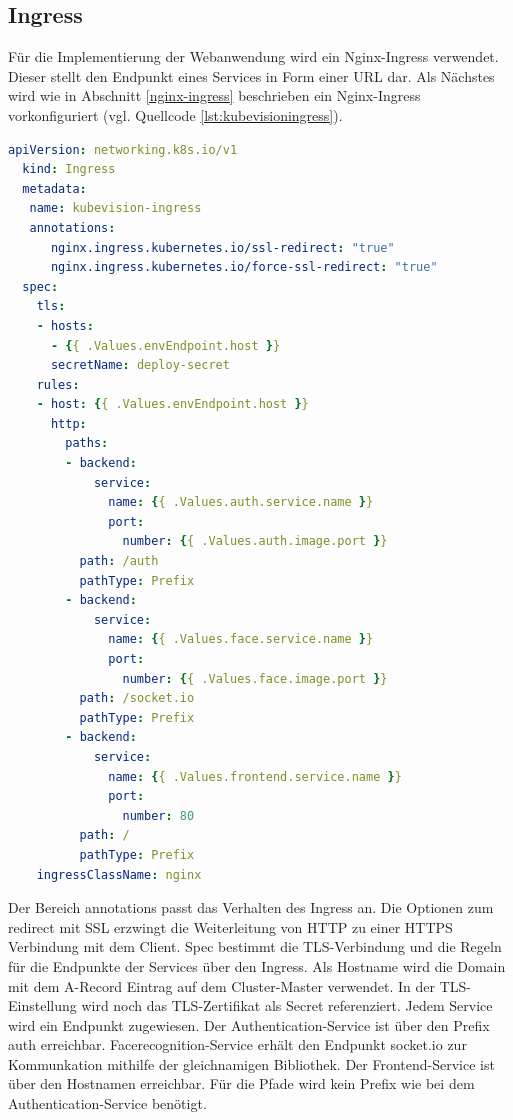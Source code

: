 \subsection{Ingress}

Für die Implementierung der Webanwendung wird ein Nginx-Ingress verwendet.
Dieser stellt den Endpunkt eines Services in Form einer URL dar.
Als Nächstes wird wie in Abschnitt \ref{nginx-ingress} beschrieben ein Nginx-Ingress vorkonfiguriert (vgl. Quellcode \ref{lst:kubevisioningress}).


\begin{lstlisting}[caption={kubevision-ingress.yaml},captionpos=b,label={lst:kubevisioningress},language=yaml]
  apiVersion: networking.k8s.io/v1
  kind: Ingress
  metadata:
   name: kubevision-ingress
   annotations:
      nginx.ingress.kubernetes.io/ssl-redirect: "true"
      nginx.ingress.kubernetes.io/force-ssl-redirect: "true"
  spec:
    tls:
    - hosts:
      - {{ .Values.envEndpoint.host }}
      secretName: deploy-secret
    rules:
    - host: {{ .Values.envEndpoint.host }}
      http:
        paths:
        - backend:
            service:
              name: {{ .Values.auth.service.name }}
              port:
                number: {{ .Values.auth.image.port }}
          path: /auth
          pathType: Prefix
        - backend:
            service:
              name: {{ .Values.face.service.name }}
              port:
                number: {{ .Values.face.image.port }}
          path: /socket.io
          pathType: Prefix
        - backend:
            service:
              name: {{ .Values.frontend.service.name }}
              port:
                number: 80
          path: /
          pathType: Prefix
    ingressClassName: nginx

\end{lstlisting}

Der Bereich annotations passt das Verhalten des Ingress an.
Die Optionen zum redirect mit SSL erzwingt die Weiterleitung von HTTP zu einer HTTPS Verbindung mit dem Client.
Spec bestimmt die TLS-Verbindung und die Regeln für die Endpunkte der Services über den Ingress.
Als Hostname wird die Domain mit dem A-Record Eintrag auf dem Cluster-Master verwendet.
In der TLS-Einstellung wird noch das TLS-Zertifikat als Secret referenziert.
Jedem Service wird ein Endpunkt zugewiesen.
Der Authentication-Service ist über den Prefix auth erreichbar.
Facerecognition-Service erhält den Endpunkt socket.io zur Kommunkation mithilfe der gleichnamigen Bibliothek.
Der Frontend-Service ist über den Hostnamen erreichbar.
Für die Pfade wird kein Prefix wie bei dem Authentication-Service benötigt.




